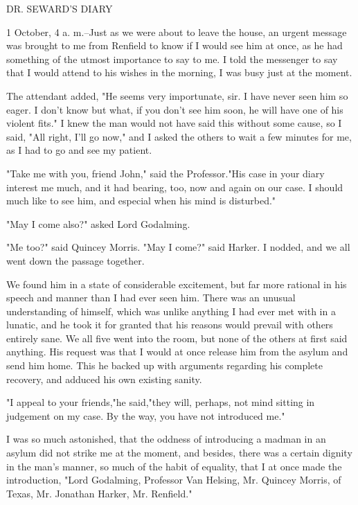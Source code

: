 DR. SEWARD'S DIARY 

1 October, 4 a. m.--Just as we were about to leave the house, an urgent message was brought to me from Renfield to know if I would see him at once, as he had something of the utmost importance to say to me. I told the messenger to say that I would attend to his wishes in the morning, I was busy just at the moment. 

The attendant added, "He seems very importunate, sir. I have never seen him so eager. I don't know but what, if you don't see him soon, he will have one of his violent fits." I knew the man would not have said this without some cause, so I said, "All right, I'll go now," and I asked the others to wait a few minutes for me, as I had to go and see my patient. 

"Take me with you, friend John," said the Professor."His case in your diary interest me much, and it had bearing, too, now and again on our case. I should much like to see him, and especial when his mind is disturbed." 

"May I come also?" asked Lord Godalming. 

"Me too?" said Quincey Morris. "May I come?" said Harker. I nodded, and we all went down the passage together. 

We found him in a state of considerable excitement, but far more rational in his speech and manner than I had ever seen him. There was an unusual understanding of himself, which was unlike anything I had ever met with in a lunatic, and he took it for granted that his reasons would prevail with others entirely sane. We all five went into the room, but none of the others at first said anything. His request was that I would at once release him from the asylum and send him home. This he backed up with arguments regarding his complete recovery, and adduced his own existing sanity. 

"I appeal to your friends,"he said,"they will, perhaps, not mind sitting in judgement on my case. By the way, you have not introduced me." 

I was so much astonished, that the oddness of introducing a madman in an asylum did not strike me at the moment, and besides, there was a certain dignity in the man's manner, so much of the habit of equality, that I at once made the introduction, "Lord Godalming, Professor Van Helsing, Mr. Quincey Morris, of Texas, Mr. Jonathan Harker, Mr. Renfield." 

